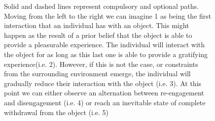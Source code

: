 \begin{figure}[h]
\caption[\textbf{Stages of the engagement process mode}]{Solid and dashed lines represent compulsory and  optional paths. Moving from the left to the right we can imagine 1 as being the first interaction that an individual has with an object. This might happen as the result of a prior belief that the object is able to provide a pleasurable experience. The individual will interact with the object for as long as this last one is able to provide a gratifying experience(i.e. 2). However, if this is not the case, or constraints from the surrounding environment emerge, the individual will gradually reduce their interaction with the object (i.e. 3). At this point we can either observe an alternation between re-engagement and disengagement (i.e. 4) or reach an inevitable state of complete withdrawal from the object (i.e. 5)}
\label{fig: eng_proc_model_1}
\end{figure}